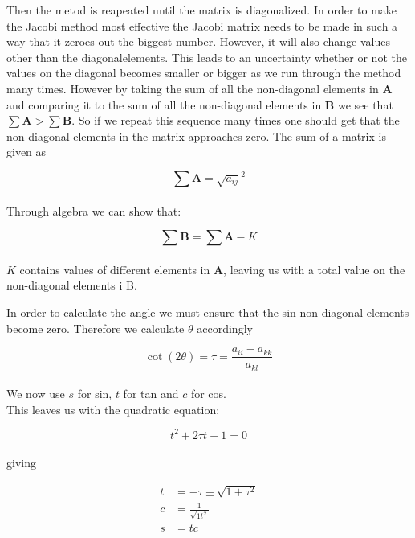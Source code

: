 \documentclass{article}
\begin{document}
Then the metod is reapeated until the matrix is diagonalized. In order to make the Jacobi method most effective the Jacobi matrix needs to be made in such a way that it zeroes out the biggest number. However, it will also change values other than the diagonalelements. This leads to an uncertainty whether or not the values on the diagonal becomes smaller or bigger as we run through the method many times. However by taking the sum of all the non-diagonal elements in \textbf{A} and comparing it to the sum of all the non-diagonal elements in \textbf{B} we see that $\sum \textbf{A} > \sum \textbf{B}$. So if we repeat this sequence many times one should get that the non-diagonal elements in the matrix approaches zero. The sum of a matrix is given as

\begin{equation}
  \sum \textbf{A} = \sqrt{a_{ij}}^2
\end{equation} \\

Through algebra we can show that:

\begin{equation}
  \sum \textbf{B} = \sum \textbf{A} - K
\end{equation} \\

$K$ contains values of different elements in \textbf{A}, leaving us with a total value on the non-diagonal elements i B.

In order to calculate the angle we must ensure that the sin non-diagonal elements become zero. Therefore we calculate $\theta$ accordingly

\begin{equation}
  \cot (2\theta)=\tau = \frac{a_{ii} - a_{kk}}{a_{kl}}
\end{equation} \\

We now use $s$ for sin, $t$ for tan and $c$ for cos. \\

This leaves us with the quadratic equation:

\begin{equation}
  t^2 + 2\tau t - 1 = 0
\end{equation} \\

giving

\begin{align}
  t &= -\tau \pm \sqrt{1+\tau^2} \\
  c &= \frac{1}{\sqrt{1t^2}} \\
  s &= tc
\end{align} \\
\end{document}
